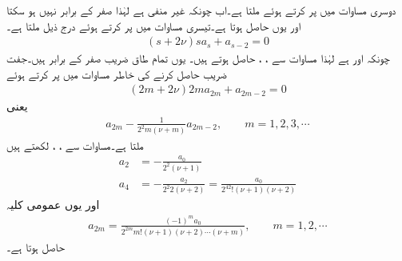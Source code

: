 دوسری مساوات   میں  پر کرتے ہوئے  ملتا ہے۔اب چونکہ  غیر منفی ہے لہٰذا  صفر کے برابر نہیں ہو سکتا اور یوں  حاصل ہوتا ہے۔تیسری مساوات   میں  پر کرتے ہوئے درج ذیل ملتا ہے۔
\begin{align}\label{مساوات_بیسل_ٹ}
(s+2\nu)sa_s+a_{s-2}=0
\end{align}
چونکہ  اور  ہے  لہٰذا مساوات  سے ، ،  حاصل ہوتے ہیں۔ یوں تمام طاق  ضریب  صفر کے برابر ہیں۔جفت  ضریب  حاصل کرنے کی خاطر مساوات  میں  پر کرتے ہوئے
\begin{align*}
(2m+2\nu)2ma_{2m}+a_{2m-2}=0
\end{align*}
یعنی
\begin{align}\label{مساوات_بیسل_ث}
a_{2m}-\frac{1}{2^2m(\nu+m)}a_{2m-2},\quad \quad m=1,2,3,\cdots
\end{align}
ملتا ہے۔مساوات  سے ، ،  لکھتے ہیں
\begin{align*}
a_2&=-\frac{a_0}{2^2(\nu+1)}\\
a_4&=-\frac{a_2}{2^2 2(\nu+2)}=\frac{a_0}{2^42!(\nu+1)(\nu+2)}
\end{align*}
اور یوں عمومی کلیہ 
\begin{align}\label{مساوات_بیسل_ج}
a_{2m}=\frac{(-1)^m a_0}{2^{2m}m!(\nu+1)(\nu+2)\cdots (\nu+m)},\quad \quad m=1,2,\cdots
\end{align}
حاصل ہوتا ہے۔

